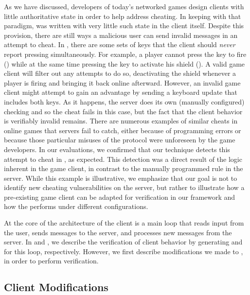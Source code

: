 As we have discussed, developers of today's networked games design
clients with little authoritative state in order to help address
cheating.  In keeping with that paradigm, \xpilot was written with
very little such state in the client itself.  Despite this provision,
there are still ways a malicious user can send invalid messages in an
attempt to cheat.  In \xpilot, there are some sets of keys that the
client should {\em never} report pressing simultaneously.  For
example, a player cannot press the key to fire (\keyfireshot) while at
the same time pressing the key to activate his shield (\keyshield).  A
valid game client will filter out any attempts to do so, deactivating
the shield whenever a player is firing and bringing it back online
afterward.  However, an invalid game client might attempt to gain an
advantage by sending a keyboard update that includes both keys.  As it
happens, the server does its own (manually configured) checking and so
the cheat fails in this case, but the fact that the client behavior is
verifiably invalid remains.  There are numerous examples of similar
cheats in online games that servers fail to catch, either because of
programming errors or because those particular misuses of the protocol
were unforeseen by the game developers.  In our evaluations, we
confirmed that our technique detects this attempt to cheat in \xpilot,
as expected.  This detection was a direct result of the logic inherent
in the game client, in contrast to the manually programmed rule in the
\xpilot server. While this example is illustrative, we emphasize that our
goal is not to identify new cheating vulnerabilities on the \xpilot
server, but rather to illustrate how a pre-existing game client can be
adapted for verification in our framework and how the \verifier
performs under different configurations.

At the core of the architecture of the \xpilot client is a main loop
that reads input from the user, sends messages to the server, and
processes new messages from the server.  In
 and , we
describe the verification of \xpilot client behavior by generating
\lazy \pathsegcons and \eager \pathsegcons for this loop,
respectively.  However, we first describe modifications we made to
\xpilot, in order to perform verification.

\subsection{Client Modifications}
\label{ssec:scv:xpilot:mods}

